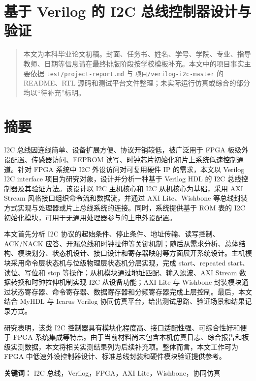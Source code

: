 \section{基于 Verilog 的 I2C
总线控制器设计与验证}\label{ux57faux4e8e-verilog-ux7684-i2c-ux603bux7ebfux63a7ux5236ux5668ux8bbeux8ba1ux4e0eux9a8cux8bc1}

\begin{quote}
本文为本科毕业论文初稿。封面、任务书、姓名、学号、学院、专业、指导教师、日期等信息请在最终排版阶段按学校模板补充。本文中的项目事实主要依据
\texttt{test/project-report.md} 与 \texttt{项目/verilog-i2c-master} 的
README、RTL
源码和测试平台文件整理；未实际运行仿真或综合的部分均以``待补充''标明。
\end{quote}

\section{摘要}\label{ux6458ux8981}

I2C 总线因连线简单、设备扩展方便、协议开销较低，被广泛用于 FPGA
板级外设配置、传感器访问、EEPROM
读写、时钟芯片初始化和片上系统低速控制通道。针对 FPGA 系统中 I2C
外设访问对可复用硬件 IP 的需求，本文以 Verilog I2C interface
项目为研究对象，设计并分析一种基于 Verilog HDL 的 I2C
总线控制器及其验证方法。该设计以 I2C 主机核心和 I2C 从机核心为基础，采用
AXI Stream 风格接口组织命令流和数据流，并通过 AXI Lite、Wishbone
等总线封装方式实现与处理器或片上总线系统的连接。同时，系统提供基于 ROM
表的 I2C 初始化模块，可用于无通用处理器参与的上电外设配置。

本文首先分析 I2C 协议的起始条件、停止条件、地址传输、读写控制、ACK/NACK
应答、开漏总线和时钟拉伸等关键机制；随后从需求分析、总体结构、模块划分、状态机设计、接口设计和寄存器映射等方面展开系统设计。主机模块采用命令层状态机与位级物理层状态机分层实现，完成
start、repeated start、读位、写位和 stop
等操作；从机模块通过地址匹配、输入滤波、AXI Stream
数据转换和时钟拉伸机制实现 I2C 从设备功能；AXI Lite 与 Wishbone
封装模块通过状态寄存器、命令寄存器、数据寄存器和分频寄存器完成上层控制。最后，本文结合
MyHDL 与 Icarus Verilog
协同仿真平台，给出测试思路、验证场景和结果记录方式。

研究表明，该类 I2C
控制器具有模块化程度高、接口适配性强、可综合性好和便于 FPGA
系统集成等特点。由于当前材料尚未包含本机仿真日志、综合报告和板级实测数据，本文将相关实测结果列为后续补充项。整体而言，本文工作可为
FPGA 中低速外设控制器设计、标准总线封装和硬件模块验证提供参考。

\textbf{关键词：} I2C 总线，Verilog，FPGA，AXI Lite，Wishbone，协同仿真

